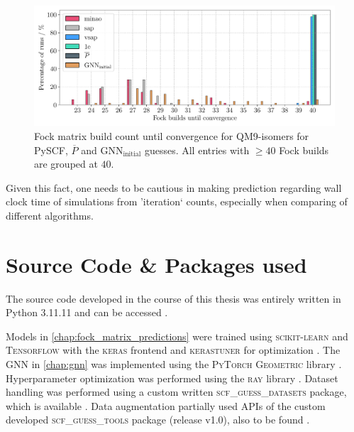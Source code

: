 \begin{figure}[H]
    \centering
    \includegraphics[width=\textwidth]{../fig/gnn/SO_0D_GNN_model_fock_build_count_bar.pdf}
    \caption[Fock matrix build count until convergence QM9-isomers]{Fock matrix build count until convergence for QM9-isomers for PySCF, $\overline{P}$ and GNN$_\text{initial}$ guesses. All entries with $\geq 40$ Fock builds are grouped at $40$.}
    \label{fig:so_fock_build_iterations}
\end{figure}
Given this fact, one needs to be cautious in making prediction regarding wall clock time of simulations from 'iteration` counts, especially when comparing of different algorithms.

\section{Source Code \& Packages used}
\label{sec:source_code_packages}
The source code developed in the course of this thesis was entirely written in Python 3.11.11 \parencite{ref:python} and can be accessed  \parencite{ref:hauser-group-github}.

Models in \autoref{chap:fock_matrix_predictions} were trained using \textsc{scikit-learn} \parencite{ref:sk-learn} and \textsc{Tensorflow} \parencite{ref:tensorflow} with the \textsc{keras} frontend \parencite{ref:keras} and \textsc{kerastuner} for optimization \parencite{ref:kerastuner}. The GNN in \autoref{chap:gnn} was implemented using the \textsc{PyTorch Geometric} library \parencite{ref:PyTorchGeometric}. Hyperparameter optimization was performed using the \textsc{ray} library \parencite{ref:ray_tune}. Dataset handling was performed using a custom written \textsc{scf\_guess\_datasets} package, which is available  \parencite{ref:milacher_scf_guess_datasets}. Data augmentation partially used APIs of the custom developed \textsc{scf\_guess\_tools} package (release v1.0), also to be found  \parencite{ref:scf_guess_tools}. 